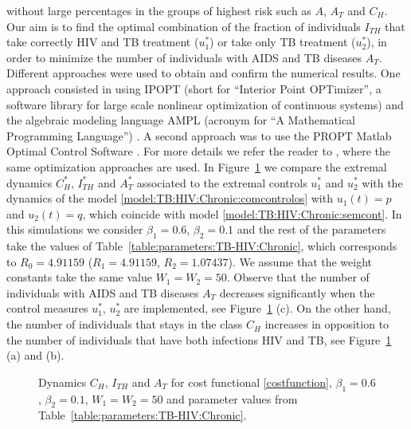 \documentclass{my_aims}
\theoremstyle{definition}
\begin{document}
without large percentages in the groups of highest risk such as $A$, $A_T$ and $C_H$.
Our aim is to find the optimal combination of the fraction of individuals
$I_{TH}$ that take correctly HIV and TB treatment ($u_1^*$) or take only TB treatment ($u_2^*$),
in order to minimize the number of individuals with AIDS and TB diseases $A_T$.
Different approaches were used to obtain and confirm the numerical results. One approach
consisted in using IPOPT (short for ``Interior Point OPTimizer'', a software library
for large scale nonlinear optimization of continuous systems) \cite{MR2195616}
and the algebraic modeling language AMPL (acronym for ``A Mathematical Programming Language'')
\cite{AMPL}. A second approach was to use the PROPT Matlab Optimal Control Software \cite{PROPT}.
For more details we refer the reader to
\cite{Silva:Torres:TBOC:NACO:2012,Silva:Torres:TBOC:MBS:2013},
where the same optimization approaches are used.
In Figure~\ref{fig:CH:ITH:AT:minAT} we compare the extremal dynamics $C_H^*$, $I_{TH}^*$ and $A_T^*$
associated to the extremal controls $u_1^*$ and $u_2^*$ with the dynamics of the model
\eqref{model:TB:HIV:Chronic:comcontrolos} with $u_1(t)=p $ and $u_2(t)=q$, which coincide
with model \eqref{model:TB:HIV:Chronic:semcont}. In this simulations we consider $\beta_1 = 0.6$,
$\beta_2 = 0.1$ and the rest of the parameters take the values of Table~\ref{table:parameters:TB-HIV:Chronic},
which corresponds to $R_0 = 4.91159$ ($R_1 = 4.91159$, $R_2 = 1.07437$).
We assume that the weight constants take the same value $W_1 = W_2 = 50$.
Observe that the number of individuals with AIDS and TB diseases $A_T$
decreases significantly when the control measures $u_1^*$, $u_2^*$ are implemented, see
Figure~\ref{fig:CH:ITH:AT:minAT} (c). On the other hand, the number of individuals that stays
in the class $C_H$ increases in opposition to the number of individuals that have both infections HIV and TB,
see Figure~\ref{fig:CH:ITH:AT:minAT} (a) and (b).
\begin{figure}[!htb]
\centering
{}
\caption{Dynamics $C_H$, $I_{TH}$ and $A_T$ for cost functional \eqref{costfunction},
$\beta_1 = 0.6$, $\beta_2 = 0.1$, $W_1 = W_2 = 50$ and parameter
values from Table~\ref{table:parameters:TB-HIV:Chronic}.}
\label{fig:CH:ITH:AT:minAT}
\end{figure}
\end{document}
